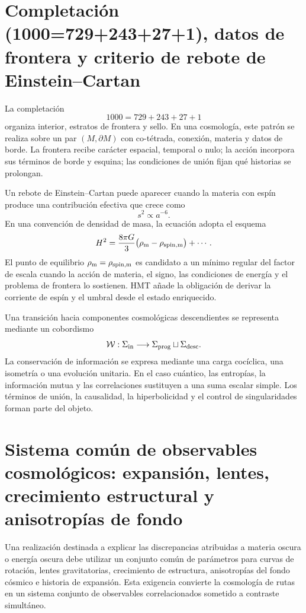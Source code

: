 \section{Completación (1000=729+243+27+1), datos de frontera y criterio de rebote de Einstein–Cartan}

La completación
\[
 1000=729+243+27+1
\]
organiza interior, estratos de frontera y sello. En una cosmología, este
patrón se realiza sobre un par \((M,\partial M)\) con co-tétrada, conexión,
materia y datos de borde. La frontera recibe carácter espacial, temporal o
nulo; la acción incorpora sus términos de borde y esquina; las condiciones de
unión fijan qué historias se prolongan.

Un rebote de Einstein--Cartan puede aparecer cuando la materia con espín
produce una contribución efectiva que crece como
\[
 s^2\propto a^{-6}.
\]
En una convención de densidad de masa, la ecuación adopta el esquema
\[
 H^2=\frac{8\pi G}{3}
 \bigl(\rho_{\rm m}-\rho_{\rm spin,m}\bigr)+\cdots.
\]
El punto de equilibrio
\(\rho_{\rm m}=\rho_{\rm spin,m}\) es candidato a un mínimo regular del
factor de escala cuando la acción de materia, el signo, las condiciones de
energía y el problema de frontera lo sostienen. HMT añade la obligación de
derivar la corriente de espín y el umbral desde el estado enriquecido.

Una transición hacia componentes cosmológicas descendientes se representa
mediante un cobordismo
\[
 \mathcal W:
 \Sigma_{\rm in}\longrightarrow
 \Sigma_{\rm prog}\sqcup\Sigma_{\rm desc}.
\]
La conservación de información se expresa mediante una carga cocíclica, una
isometría o una evolución unitaria. En el caso cuántico, las entropías, la
información mutua y las correlaciones sustituyen a una suma escalar simple.
Los términos de unión, la causalidad, la hiperbolicidad y el control de
singularidades forman parte del objeto.

\section{Sistema común de observables cosmológicos: expansión, lentes, crecimiento estructural y anisotropías de fondo}

Una realización destinada a explicar las discrepancias atribuidas a materia
oscura o energía oscura debe utilizar un conjunto común de parámetros para
curvas de rotación, lentes gravitatorias, crecimiento de estructura,
anisotropías del fondo cósmico e historia de expansión. Esta exigencia
convierte la cosmología de rutas en un sistema conjunto de observables
correlacionados sometido a contraste simultáneo.


